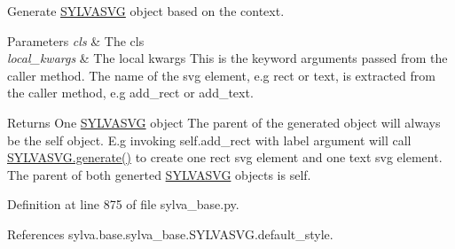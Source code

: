 Generate \hyperlink{classsylva_1_1base_1_1sylva__base_1_1_s_y_l_v_a_s_v_g}{S\+Y\+L\+V\+A\+S\+VG} object based on the context. 


\begin{DoxyParams}{Parameters}
{\em cls} & The cls \\
\hline
{\em local\+\_\+kwargs} & The local kwargs This is the keyword arguments passed from the caller method. The name of the svg element, e.\+g {\ttfamily rect} or {\ttfamily text}, is extracted from the caller method, e.\+g {\ttfamily add\+\_\+rect} or {\ttfamily add\+\_\+text}.\\
\hline
\end{DoxyParams}
\begin{DoxyReturn}{Returns}
One \hyperlink{classsylva_1_1base_1_1sylva__base_1_1_s_y_l_v_a_s_v_g}{S\+Y\+L\+V\+A\+S\+VG} object The parent of the generated object will always be the {\ttfamily self} object. E.\+g invoking {\ttfamily self.\+add\+\_\+rect} with {\ttfamily label} argument will call \hyperlink{classsylva_1_1base_1_1sylva__base_1_1_s_y_l_v_a_s_v_g_ae0e18ce2b9be0def86deee37cffbb8a7}{S\+Y\+L\+V\+A\+S\+V\+G.\+generate()} to create one {\ttfamily rect} svg element and one {\ttfamily text} svg element. The parent of both generted \hyperlink{classsylva_1_1base_1_1sylva__base_1_1_s_y_l_v_a_s_v_g}{S\+Y\+L\+V\+A\+S\+VG} objects is {\ttfamily self}. 
\end{DoxyReturn}


Definition at line 875 of file sylva\+\_\+base.\+py.



References sylva.\+base.\+sylva\+\_\+base.\+S\+Y\+L\+V\+A\+S\+V\+G.\+default\+\_\+style.


